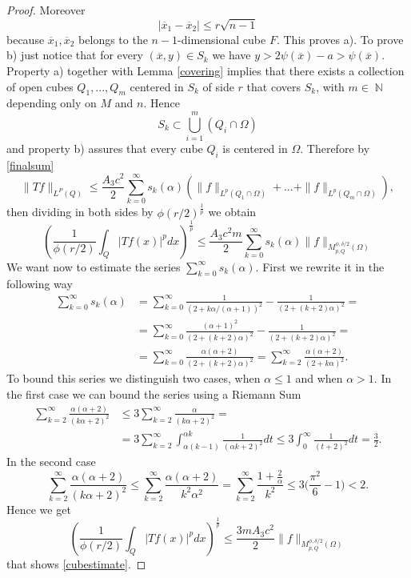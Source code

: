 \documentclass[12pt]{article}
\theoremstyle{definition}
\DeclareMathOperator\nn{\mathbb{N}}
\begin{document}
\begin{proof}
Moreover 
\[ |\overline x_1 - \overline x_2|\le r \sqrt {n-1}\]
because $\overline x_1,\overline x_2 $ belongs to the $n-1$-dimensional cube $F.$ This proves a). To prove b) just notice that for every $(\overline x, y ) \in S_k$ we have $y>2\psi(\overline x)-a>\psi(\overline x)$.
Property a) together with Lemma \ref{covering} implies that there exists a collection of open cubes $Q_1,...,Q_m$ centered in $S_k$ of side $r$ that covers $S_k$, with $m \in \nn$ depending only on $M$ and $n$. Hence
\[ S_k \subset \bigcup_{i=1}^m (Q_i\cap \Omega) \]
and property b) assures that every cube $Q_i$ is centered in $\Omega.$ Therefore by \eqref{finalsum} 
\[ \| Tf\|_{L^P(Q)} \le \frac{A_3c^2}{2}\sum_{k=0}^\infty s_k(\alpha) (\|f\|_{L^p(Q_1\cap \Omega)}+...+\|f\|_{L^p(Q_m\cap \Omega)}),\]
 then dividing in both sides by $\phi(r/2)^{\frac{1}{p}}$ we obtain
\[\left(\frac{1}{\phi(r/2)}\int_Q|Tf(x)|^p dx\right)^{\frac{1}{p}} \le \frac{A_3c^2m}{2} \sum_{k=0}^\infty s_k(\alpha) \| f\|_{M^{\phi,\delta/2}_{p,Q}(\Omega)} \]
We want now to estimate the series $\sum_{k=0}^\infty s_k(\alpha)$. First we rewrite it in the following way
\begin{align*}
\sum_{k=0}^\infty s_k(\alpha)&=\sum_{k=0}^\infty \frac{1}{(2+k\alpha/(\alpha+1))^2} -\frac{1}{(2+(k+2)\alpha)^2}=\\
&=\sum_{k=0}^\infty \frac{(\alpha+1)^2}{(2+(k+2)\alpha)^2} -\frac{1}{(2+(k+2)\alpha)^2}=\\
&=\sum_{k=0}^\infty \frac{\alpha(\alpha+2)}{(2+(k+2)\alpha)^2}= \sum_{k=2}^\infty \frac{\alpha(\alpha+2)}{(2+k\alpha)^2}.
\end{align*}
To bound this series we distinguish two cases, when $\alpha\le 1$ and when $\alpha>1$. In the first case we can bound the series using a Riemann Sum
\begin{align*}
\sum_{k=2}^\infty \frac{\alpha(\alpha+2)}{(k\alpha+2)^2} &\le 3\sum_{k=2}^\infty \frac{\alpha}{(k\alpha+2)^2}=\\
&=3\sum_{k=2}^\infty \int_{\alpha (k-1)}^{\alpha k} \frac{1}{(\alpha k+2)^2}dt \le 3\int_0^\infty \frac{1}{(t+2)^2}dt=\frac{3}{2}. 
\end{align*}
In the second case
\[  \sum_{k=2}^\infty \frac{\alpha(\alpha+2)}{(k\alpha+2)^2}  \le \sum_{k=2}^\infty \frac{\alpha(\alpha+2)}{k^2\alpha^2}=\sum_{k=2}^\infty \frac{1+\frac{2}{\alpha}}{k^2} \le 3 \bigl(\frac{\pi^2}{6}-1\bigr)<2.\]
Hence we get 
\[\left(\frac{1}{\phi(r/2)}\int_Q|Tf(x)|^p dx\right)^{\frac{1}{p}} \le \frac{3mA_3c^2}{2} \| f\|_{M_{p,Q}^{\phi,\delta/2}(\Omega)} \]
that shows \eqref{cubestimate}. 


\end{proof}
\end{document}
